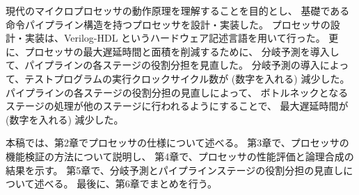 \documentclass[../main.tex]{subfiles}
\begin{document}
  現代のマイクロプロセッサの動作原理を理解することを目的とし、
  基礎である命令パイプライン構造を持つプロセッサを設計・実装した。
  プロセッサの設計・実装は、Verilog-HDL というハードウェア記述言語を用いて行った。
  更に、プロセッサの最大遅延時間と面積を削減するために、
  分岐予測を導入して、パイプラインの各ステージの役割分担を見直した。
  分岐予測の導入によって、テストプログラムの実行クロックサイクル数が (数字を入れる) 減少した。%
  パイプラインの各ステージの役割分担の見直しによって、
  ボトルネックとなるステージの処理が他のステージに行われるようにすることで、
  最大遅延時間が (数字を入れる) 減少した。 %

  本稿では、第2章でプロセッサの仕様について述べる。
  第3章で、プロセッサの機能検証の方法について説明し、
  第4章で、プロセッサの性能評価と論理合成の結果を示す。
  第5章で、分岐予測とパイプラインステージの役割分担の見直しについて述べる。
  最後に、第6章でまとめを行う。
\end{document}

